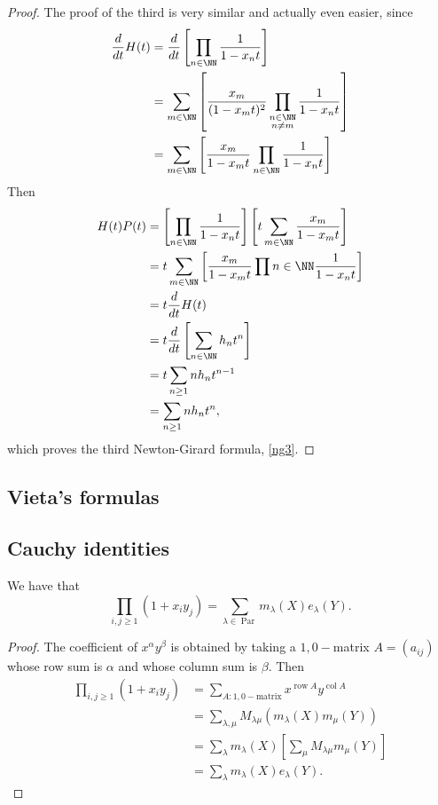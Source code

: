 \documentclass{article}
\DeclareMathOperator{\row}{row}
\DeclareMathOperator{\col}{col}
\DeclareMathOperator{\Par}{Par}
\begin{document}
\begin{proof}
    The proof of the third is very similar and actually even easier, since
    \begin{align*}
        \frac{d}{dt}H(t) &= \frac{d}{dt}\left[\prod_{n\in\NN}\frac{1}{1-x_nt}\right] \\
                         &= \sum_{m\in\NN}\left[\frac{x_m}{(1-x_mt)^2}\prod_{\substack{n\in\NN \\ n \neq m}}\frac{1}{1-x_nt}\right] \\ 
                         &= \sum_{m\in\NN}\left[\frac{x_m}{1-x_mt}\prod_{n\in\NN}\frac{1}{1-x_nt}\right]
    \end{align*}
    Then
    \begin{align*}
        H(t)P(t) &= \left[\prod_{n\in\NN}\frac{1}{1-x_nt}\right]\left[t\sum_{m\in\NN}\frac{x_m}{1-x_mt}\right] \\
                 &= t\sum_{m\in\NN}\left[\frac{x_m}{1-x_mt}\prod{n\in\NN}\frac{1}{1-x_nt}\right] \\
                 &= t\frac{d}{dt}H(t) \\
                 &= t\frac{d}{dt}\left[\sum_{n\in\NN}h_nt^n\right] \\
                 &= t\sum_{n\geq 1}nh_nt^{n-1} \\
                 &= \sum_{n\geq 1}nh_nt^n,
    \end{align*}
    which proves the third Newton-Girard formula, \eqref{ng3}.
\end{proof}

\subsection{Vieta's formulas}

\subsection{Cauchy identities}

\begin{theorem}\label{CauchyIdentityForME}
    We have that
    \[
        \prod_{i,j \geq 1} (1+x_iy_j) = \sum_{\lambda\in\Par} m_\lambda(X) e_\lambda(Y).
    \]
\end{theorem}

\begin{proof}
    The coefficient of $x^\alpha y^\beta$ is obtained by taking a $1,0-$matrix $A = (a_{ij})$ whose row sum is $\alpha$ and whose column sum is $\beta$. Then
    \begin{align*}
        \prod_{i,j\geq1}(1+x_iy_j) &= \sum_{A:1,0-\text{matrix}}x^{\row A}y^{\col A} \\
                                   &= \sum_{\lambda,\mu} M_{\lambda\mu} (m_\lambda(X) m_\mu(Y)) \\
                                   &= \sum_{\lambda} m_\lambda(X) \left[\sum_\mu M_{\lambda\mu} m_\mu(Y)\right]\\
                                   &= \sum_\lambda m_\lambda(X) e_\lambda(Y).
    \end{align*}
\end{proof}
\end{document}
